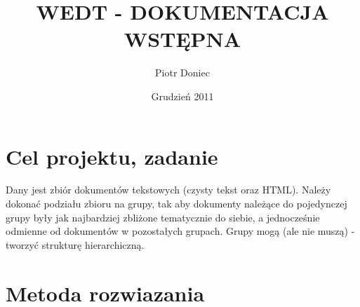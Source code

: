 \documentclass{article}
\begin{document}
\title{WEDT - DOKUMENTACJA WSTĘPNA}
\author{Piotr Doniec}
\date {Grudzień 2011}
\maketitle

\section{Cel projektu, zadanie}
Dany jest zbiór dokumentów tekstowych (czysty tekst oraz HTML). Należy dokonać podziału zbioru na grupy, tak aby dokumenty należące do pojedynczej grupy były jak najbardziej zbliżone tematycznie do siebie, a jednocześnie odmienne od dokumentów w pozostałych grupach. Grupy mogą (ale nie muszą) - tworzyć strukturę hierarchiczną. 

\section{Metoda rozwiazania}
\end{document}
